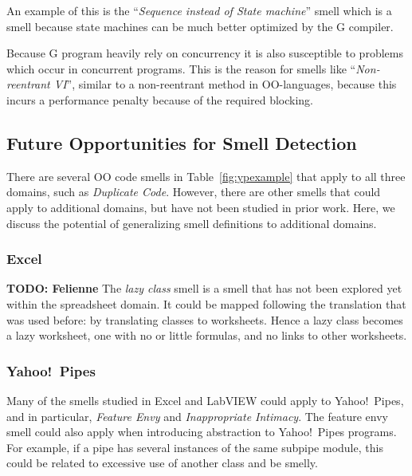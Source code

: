 \documentclass[10pt,conference,compsocconf]{IEEEtran}
\newcommand{\todo}[1]{\textbf{TODO: #1}}
\begin{document}
An example of this is the ``\textit{Sequence instead of State machine}'' smell which is a smell because state machines can be much better optimized by the G compiler.

Because G program heavily rely on concurrency it is also susceptible to problems which occur in concurrent programs.
This is the reason for smells like ``\textit{Non-reentrant VI}'', similar to a non-reentrant method in OO-languages, because this incurs a performance penalty because of the required blocking.

\subsection{Future Opportunities for Smell Detection}
\label{subsec:futuresmells}
There are several OO code smells in Table~\ref{fig:ypexample} that apply to all three domains, such as \emph{Duplicate Code}. However, there are other smells that could apply to additional domains, but have not been studied in prior work. Here, we discuss the potential of generalizing smell definitions to additional domains. 

\subsubsection{Excel} \todo{Felienne}
The \emph{lazy class} smell is a smell that has not been explored yet within the spreadsheet domain. It could be mapped following the translation that was used before: by translating classes to worksheets. Hence a lazy class becomes a lazy worksheet, one with no or little formulas, and no links to other worksheets.


\subsubsection{Yahoo!\ Pipes}
Many of the smells studied in Excel and LabVIEW could apply to Yahoo!\ Pipes, and in particular, \emph{Feature Envy} and \emph{Inappropriate Intimacy}. 
The feature envy smell could also apply when introducing abstraction to Yahoo!\ Pipes programs. For example, if a pipe has several instances of the same subpipe module, this could be related to excessive use of another class and be smelly. 
\end{document}
